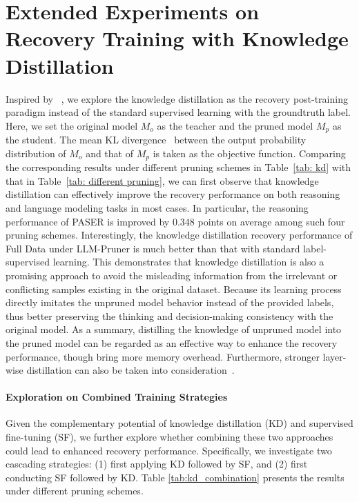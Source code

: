 \section{Extended Experiments on Recovery Training with Knowledge Distillation}
\label{appendix: knoledge distillation}
Inspired by ~\citep{muralidharan2024compact}, we explore the knowledge distillation as the recovery post-training paradigm instead of the standard supervised learning with the groundtruth label. Here, we set the original model $M_o$ as the teacher and the pruned model $M_p$ as the student. The mean KL divergence~\citep{kullback1951information} between the output probability distribution of $M_o$ and that of $M_p$ is taken as the objective function. Comparing the corresponding results under different pruning schemes in Table~\ref{tab: kd} with that in Table~\ref{tab: different pruning}, we can first observe that knowledge distillation can effectively improve the recovery performance on both reasoning and language modeling tasks in most cases. In particular, the reasoning performance of PASER is improved by 0.348 points on average among such four pruning schemes. Interestingly, the knowledge distillation recovery performance of Full Data under LLM-Pruner is much better than that with standard label-supervised learning. This demonstrates that knowledge distillation is also a promising approach to avoid the misleading information from the irrelevant or conflicting samples existing in the original dataset. Because its learning process directly imitates the unpruned model behavior instead of the provided labels, thus better preserving the thinking and decision-making consistency with the original model. As a summary, distilling the knowledge of unpruned model into the pruned model can be regarded as an effective way to enhance the recovery performance, though bring more memory overhead. Furthermore, stronger layer-wise distillation can also be taken into consideration~\citep{jiao2020tinybert}.
\vspace{-3mm}
\paragraph{Exploration on Combined Training Strategies}
Given the complementary potential of knowledge distillation (KD) and supervised fine-tuning (SF), we further explore whether combining these two approaches could lead to enhanced recovery performance. Specifically, we investigate two cascading strategies: (1) first applying KD followed by SF, and (2) first conducting SF followed by KD. Table \ref{tab:kd_combination} presents the results under different pruning schemes.

